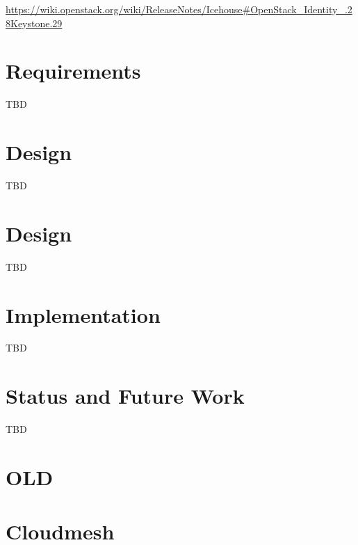 \documentclass{tex/sig-alternate-2013}
\begin{document}
  \url{https://wiki.openstack.org/wiki/ReleaseNotes/Icehouse#OpenStack_Identity_.28Keystone.29}



\section{Requirements}

TBD

\section{Design}

TBD
\section{Design}

TBD

\section{Implementation}

TBD

\section{Status and Future Work}

TBD


\section{OLD}


\section{Cloudmesh}\label{S:cloudmesh}
\end{document}
